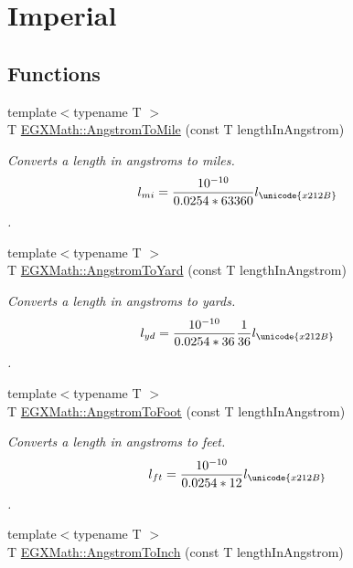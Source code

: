 \hypertarget{group___e_g_x_math-_conversions-_length_conversions-_non-_s_i-_angstrom-_imperial}{}\section{Imperial}
\label{group___e_g_x_math-_conversions-_length_conversions-_non-_s_i-_angstrom-_imperial}
\subsection*{Functions}
\begin{DoxyCompactItemize}
\item 
{\footnotesize template$<$typename T $>$ }\\T \mbox{\hyperlink{group___e_g_x_math-_conversions-_length_conversions-_non-_s_i-_angstrom-_imperial_ga184d0b1ccefcc2e210a8a42530573bac}{E\+G\+X\+Math\+::\+Angstrom\+To\+Mile}} (const T length\+In\+Angstrom)
\begin{DoxyCompactList}\small\item\em Converts a length in angstroms to miles. \[ l_{mi}=\frac{10^{-10}}{0.0254 * 63360} l_{\unicode{x212B}} \]. \end{DoxyCompactList}\item 
{\footnotesize template$<$typename T $>$ }\\T \mbox{\hyperlink{group___e_g_x_math-_conversions-_length_conversions-_non-_s_i-_angstrom-_imperial_ga57cb8a4219a83a504bf2ea1e7d250144}{E\+G\+X\+Math\+::\+Angstrom\+To\+Yard}} (const T length\+In\+Angstrom)
\begin{DoxyCompactList}\small\item\em Converts a length in angstroms to yards. \[ l_{yd}= \frac{10^{-10}}{0.0254 * 36} \frac{1}{36} l_{\unicode{x212B}} \]. \end{DoxyCompactList}\item 
{\footnotesize template$<$typename T $>$ }\\T \mbox{\hyperlink{group___e_g_x_math-_conversions-_length_conversions-_non-_s_i-_angstrom-_imperial_ga54cf539cd2acf7065ed22fb4a846d933}{E\+G\+X\+Math\+::\+Angstrom\+To\+Foot}} (const T length\+In\+Angstrom)
\begin{DoxyCompactList}\small\item\em Converts a length in angstroms to feet. \[ l_{ft}= \frac{10^{-10}}{0.0254 * 12} l_{\unicode{x212B}} \]. \end{DoxyCompactList}\item 
{\footnotesize template$<$typename T $>$ }\\T \mbox{\hyperlink{group___e_g_x_math-_conversions-_length_conversions-_non-_s_i-_angstrom-_imperial_ga7866f39e7fdf861be15eda81aa1b3f0c}{E\+G\+X\+Math\+::\+Angstrom\+To\+Inch}} (const T length\+In\+Angstrom)

\end{DoxyCompactItemize}
